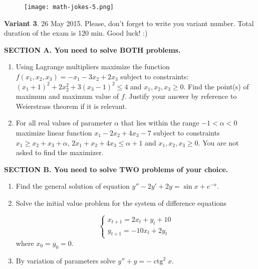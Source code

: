 \documentclass[12pt,a4paper]{article}
\DeclareMathOperator{\ctg}{ctg}
\begin{document}
\begin{figure}[hbtp]
\centering
\texttt{[image: math-jokes-5.png]}
\end{figure}



\newpage
\thispagestyle{empty}
\textbf{Variant 3}. 26 May 2015. Please, don't forget to write you variant number. Total duration of the exam is 120 min. Good luck! :) 

\vspace{0.6cm}

\textbf{SECTION A. You need to solve BOTH problems.}

\begin{enumerate}

\item Using Lagrange multipliers maximize the function $f(x_1,x_2,x_3)=-x_1-3x_2+2x_3$ subject to constraints:   $(x_1+1)^2+2x_2^2+3(x_3-1)^2\leq 4$ and $x_1, x_2, x_3 \geq 0$. Find the point(s) of maximum and maximum value of $f$. Justify your answer by reference to Weierstrass theorem if it is relevant.

\item For all real values of parameter $\alpha$ that lies within the range $-1<\alpha<0$ maximize linear function $x_1-2x_2+4x_3-7$ subject to constraints  $x_1\geq x_2+x_3+\alpha$,  $2x_1+x_2+4x_3\leq \alpha+1$ and $x_1, x_2, x_3 \geq 0$. You are not asked to find the maximizer.

\end{enumerate}


\textbf{SECTION B. You need to solve TWO problems of your choice. }

\begin{enumerate}[resume]

\item Find the general solution of equation $y''-2y'+2y=\sin x + e^{-x}$.

\item Solve the initial value problem for the system of difference equations

\[
\begin{cases}
x_{t+1}=2x_t+y_t+10 \\
y_{t+1}=-10x_t+2y_t
\end{cases}
\]
where $x_0=y_0=0$.

\item By variation of parameters solve $y''+y=-\ctg^2 x$.

\end{enumerate}
\end{document}
